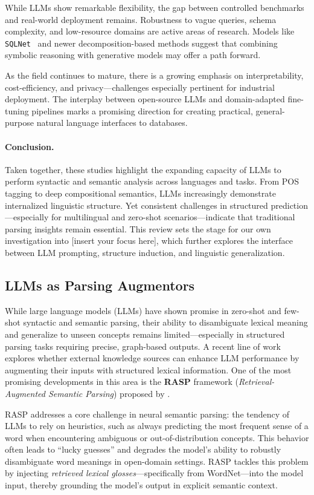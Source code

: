 While LLMs show remarkable flexibility, the gap between controlled benchmarks and real-world deployment remains. Robustness to vague queries, schema complexity, and low-resource domains are active areas of research. Models like \texttt{SQLNet}~\cite{xu2017sqlnet} and newer decomposition-based methods suggest that combining symbolic reasoning with generative models may offer a path forward.

As the field continues to mature, there is a growing emphasis on interpretability, cost-efficiency, and privacy---challenges especially pertinent for industrial deployment. The interplay between open-source LLMs and domain-adapted fine-tuning pipelines marks a promising direction for creating practical, general-purpose natural language interfaces to databases.

\paragraph{Conclusion.}
Taken together, these studies highlight the expanding capacity of LLMs to perform syntactic and semantic analysis across languages and tasks. From POS tagging to deep compositional semantics, LLMs increasingly demonstrate internalized linguistic structure. Yet consistent challenges in structured prediction—especially for multilingual and zero-shot scenarios—indicate that traditional parsing insights remain essential. This review sets the stage for our own investigation into [insert your focus here], which further explores the interface between LLM prompting, structure induction, and linguistic generalization.

\subsection{LLMs as Parsing Augmentors}

While large language models (LLMs) have shown promise in zero-shot and few-shot syntactic and semantic parsing, their ability to disambiguate lexical meaning and generalize to unseen concepts remains limited—especially in structured parsing tasks requiring precise, graph-based outputs. A recent line of work explores whether external knowledge sources can enhance LLM performance by augmenting their inputs with structured lexical information. One of the most promising developments in this area is the \textbf{RASP} framework (\textit{Retrieval-Augmented Semantic Parsing}) proposed by \citet{zhang2024rasp}.

RASP addresses a core challenge in neural semantic parsing: the tendency of LLMs to rely on heuristics, such as always predicting the most frequent sense of a word when encountering ambiguous or out-of-distribution concepts. This behavior often leads to ``lucky guesses'' and degrades the model's ability to robustly disambiguate word meanings in open-domain settings. RASP tackles this problem by injecting \textit{retrieved lexical glosses}—specifically from WordNet—into the model input, thereby grounding the model’s output in explicit semantic context.

